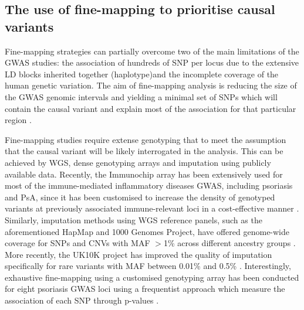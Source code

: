 \subsection{The use of fine-mapping to prioritise causal variants}
Fine-mapping strategies can partially overcome two of the main limitations of the GWAS studies: the association of hundreds of SNP per locus due to the extensive LD blocks inherited together (haplotype)and the incomplete coverage of the human genetic variation. The aim of fine-mapping analysis is reducing the size of the GWAS genomic intervals and yielding a minimal set of SNPs which will contain the causal variant and explain most of the association for that particular region \parencite{Spain2015}.

Fine-mapping studies require extense genotyping that to meet the assumption that the causal variant will be likely interrogated in the analysis. This can be achieved by WGS, dense genotyping arrays and imputation using publicly available data. Recently, the Immunochip array has been extensively used for most of the immune-mediated inflammatory diseases GWAS, including psoriasis and PsA, since it has been customised to increase the density of genotyped variants at previously associated immune-relevant loci in a cost-effective manner \parencite{Trynka2011}. Similarly, imputation methods using WGS reference panels, such as the aforementioned HapMap and 1000 Genomes Project, have offered genome-wide coverage for SNPs and CNVs with MAF $>$1\% across different ancestry groups \parencite{Abecasis2012}. More recently, the UK10K project has improved the quality of imputation specifically for rare variants with MAF between 0.01\% and 0.5\% \parencite{Chou2016}. Interestingly, exhaustive fine-mapping using a customised genotyping array has been conducted for eight psoriasis GWAS loci using a frequentist approach which measure the association of each SNP through p-values \parencite{Das2014}. 

